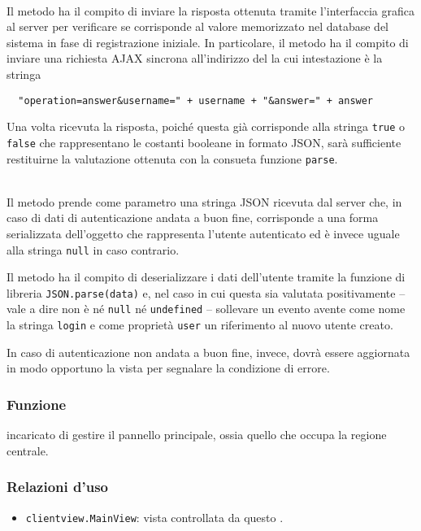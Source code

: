 \begin{description}
\item{}\\
Il metodo ha il compito di inviare la risposta ottenuta tramite l'interfaccia grafica al server per verificare se corrisponde al valore memorizzato nel database del sistema in fase di registrazione iniziale. In particolare, il metodo ha il compito di inviare una richiesta AJAX sincrona all'indirizzo del  la cui intestazione è la stringa
\begin{verbatim}
  "operation=answer&username=" + username + "&answer=" + answer
\end{verbatim}

Una volta ricevuta la risposta, poiché questa già corrisponde alla stringa \verb+true+ o \verb+false+ che rappresentano le costanti booleane in formato JSON, sarà sufficiente restituirne la valutazione ottenuta con la consueta funzione \verb+parse+.

\item{}\\
Il metodo prende come parametro una stringa JSON ricevuta dal server che, in caso di dati di autenticazione andata a buon fine, corrisponde a una forma serializzata dell'oggetto che rappresenta l'utente autenticato ed è invece uguale alla stringa \verb+null+ in caso contrario.

Il metodo ha il compito di deserializzare i dati dell'utente tramite la funzione di libreria \verb+JSON.parse(data)+ e, nel caso in cui questa sia valutata positivamente -- vale a dire non è né \verb+null+ né \verb+undefined+ -- sollevare un evento avente come nome la stringa \verb'login' e come proprietà \verb+user+ un riferimento al nuovo utente creato.

In caso di autenticazione non andata a buon fine, invece, dovrà essere aggiornata in modo opportuno la vista per segnalare la condizione di errore.

\end{description}



\subsubsection*{Funzione}
 incaricato di gestire il pannello principale, ossia quello che occupa la regione centrale.

\subsubsection*{Relazioni d'uso}
\begin{itemize}
  \item \texttt{clientview.MainView}: vista controllata da questo .
\end{itemize}


